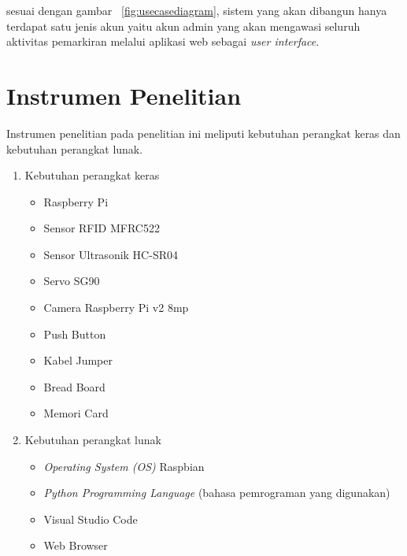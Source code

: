 sesuai dengan gambar ~\ref{fig:usecasediagram}, sistem yang akan dibangun hanya terdapat satu jenis akun yaitu akun admin yang akan mengawasi seluruh aktivitas pemarkiran melalui aplikasi web sebagai \textit{user interface}.

\section{Instrumen Penelitian}
Instrumen penelitian pada penelitian ini meliputi kebutuhan perangkat keras dan kebutuhan perangkat lunak.

\begin{enumerate}[topsep=0pt,itemsep=0pt,partopsep=0pt, parsep=0pt]
\item Kebutuhan perangkat keras
    \begin{itemize}[topsep=0pt,itemsep=0pt,partopsep=0pt, parsep=0pt,]
        \item Raspberry Pi
        \item Sensor RFID MFRC522
        \item Sensor Ultrasonik HC-SR04
        \item Servo SG90
        \item Camera Raspberry Pi v2 8mp
        \item Push Button
        \item Kabel Jumper
        \item Bread Board
        \item Memori Card
    \end{itemize}
\item Kebutuhan perangkat lunak
    \begin{itemize}[topsep=0pt,itemsep=0pt,partopsep=0pt, parsep=0pt,]
        \item \textit{Operating System (OS)} Raspbian
        \item \textit{Python Programming Language} (bahasa pemrograman yang digunakan)
        \item Visual Studio Code
        \item Web Browser
    \end{itemize}
\end{enumerate}